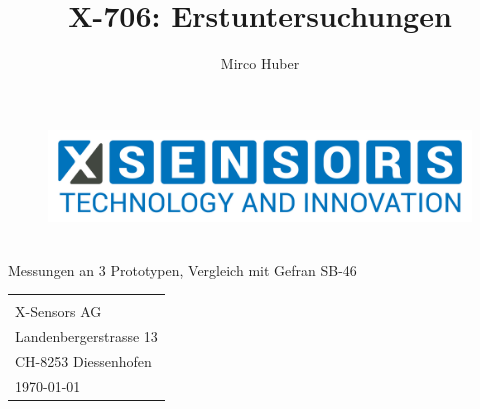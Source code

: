 \documentclass[12pt,a4paper]{article}
\author{Mirco Huber}
\title{X-706: Erstuntersuchungen}
\newcommand{\subtitle}{Messungen an 3 Prototypen, Vergleich mit Gefran SB-46}
\begin{document}
	\begin{titlepage}
		\begin{figure}[H]
			\centering
			\includegraphics[width=.5\linewidth]{Logos/X-SENSORS-Logo_Slogan_EN_Transparent.png}
		\end{figure}
		\vspace*{3cm}
		\begin{center}
			\Huge {\thetitle} \\\vspace*{.5cm}
			\small {\subtitle}
		\end{center}
		\vspace{12cm}
		\hspace{.6\linewidth} 
		\begin{tabular}{l}	
			\small{\theauthor} \\[.5pt]  
			\small{X-Sensors AG} \\ 
			\small{Landenbergerstrasse 13} \\
			\small{CH-8253 Diessenhofen} \\ [.5cm] 	
			\today
		\end{tabular}
	\end{titlepage}
\end{document}

